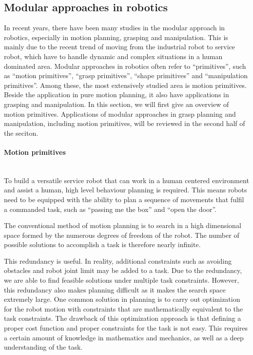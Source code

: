 





\subsection{Modular approaches in robotics}
\label{cha2:sec3:robotics}
In recent years, there have been many studies in the modular approach in robotics, especially in motion planning, grasping and manipulation. This is mainly due to the recent trend of moving from the industrial robot to service robot, which have to handle dynamic and complex situations in a human dominated area.
Modular approaches in robotics often refer to ``primitives'', such as ``motion primitives'', ``grasp primitives'', ``shape primitives'' and ``manipulation primitives''. Among these, the most extensively studied area is motion primitives. Beside the application in pure motion planning, it also have applications in grasping and manipulation.
In this section, we will first give an overview of motion primitives. Applications of modular approaches in grasp planning and manipulation, including motion primitives, will be reviewed in the second half of the seciton.


\paragraph{Motion primitives} 
\label{cha2:sec3:robotics:motionprimitives}
~\\
To build a versatile service robot that can work in a human centered environment and assist a human, high level behaviour planning is required. This means robots need to be equipped with the ability to plan a sequence of movements that fulfil a commanded task, such as ``passing me the box'' and ``open the door''.

The conventional method of motion planning is to search in a high dimensional space formed by the numerous degrees of freedom of the robot. The number of possible solutions to accomplish a task is therefore nearly infinite.

This redundancy is useful. In reality, additional constraints such as avoiding obstacles and robot joint limit may be added to a task. Due to the redundancy, we are able to find feasible solutions under multiple task constraints. However, this redundancy also makes planning difficult as it makes the search space extremely large. One common solution in planning is to carry out optimization for the robot motion with constraints that are mathematically equivalent to the task constraints.
The drawback of this optimization approach is that defining a proper cost function and proper constraints for the task is not easy. This requires a certain amount of knowledge in mathematics and mechanics, as well as a deep understanding of the task.

